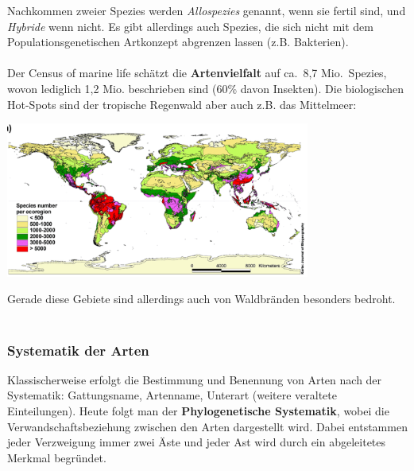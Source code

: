 Nachkommen zweier Spezies werden \textit{Allospezies} genannt, wenn sie fertil sind, und \textit{Hybride} wenn nicht. Es gibt allerdings auch Spezies, die sich nicht mit dem Populationsgenetischen Artkonzept abgrenzen lassen (z.B. Bakterien).
\\
\\
Der Census of marine life schätzt die \textbf{Artenvielfalt} auf ca.\ 8,7 Mio.\ Spezies, wovon lediglich 1,2 Mio. beschrieben sind (60\% davon Insekten). Die biologischen Hot-Spots sind der tropische Regenwald aber auch z.B. das Mittelmeer:

\begin{center}
	\includegraphics[width=10cm]{lec1/figures/bio-hotspots.png}
\end{center} 
Gerade diese Gebiete sind allerdings auch von Waldbränden besonders bedroht. 
\\
\\
\subsubsection{Systematik der Arten}

Klassischerweise erfolgt die Bestimmung und Benennung von Arten nach der Systematik: Gattungsname, Artenname, Unterart (weitere veraltete Einteilungen). Heute folgt man der \textbf{Phylogenetische Systematik}, wobei die Verwandschaftsbeziehung zwischen den Arten dargestellt wird. Dabei entstammen jeder Verzweigung immer zwei Äste und jeder Ast wird durch ein abgeleitetes Merkmal begründet.


